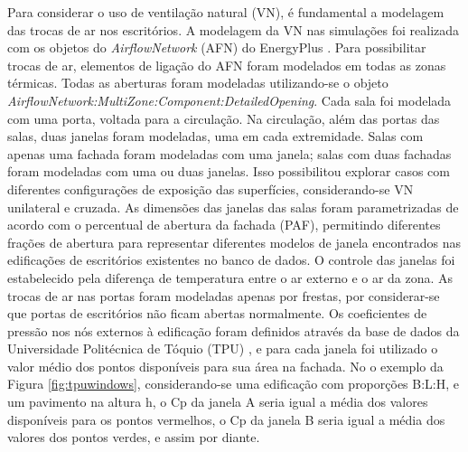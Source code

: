\documentclass[brazil,hardcopy,openany,a5paper]{ufscthesis}
\begin{document}
		Para considerar o uso de ventilação natural (VN), é fundamental a modelagem das trocas de ar nos escritórios. A modelagem da VN nas simulações foi realizada com os objetos do \textit{AirflowNetwork} (AFN) do EnergyPlus \cite{EnergyPlus2018}.
		Para possibilitar trocas de ar, elementos de ligação do AFN foram modelados em todas as zonas térmicas.
		Todas as aberturas foram modeladas utilizando-se o objeto \textit{AirflowNetwork:MultiZone:Component:DetailedOpening}.
		Cada sala foi modelada com uma porta, voltada para a circulação.
		Na circulação, além das portas das salas, duas janelas foram modeladas, uma em cada extremidade. 
		Salas com apenas uma fachada foram modeladas com uma janela; salas com duas fachadas foram modeladas com uma ou duas janelas. Isso possibilitou explorar casos com diferentes configurações de exposição das superfícies, considerando-se VN unilateral e cruzada.		
		As dimensões das janelas das salas foram parametrizadas de acordo com o percentual de abertura da fachada (PAF), permitindo diferentes frações de abertura para representar diferentes modelos de janela encontrados nas edificações de escritórios existentes no banco de dados.
		O controle das janelas foi estabelecido pela diferença de temperatura entre o ar externo e o ar da zona.
		As trocas de ar nas portas foram modeladas apenas por frestas, por considerar-se que portas de escritórios não ficam abertas normalmente.  %
		Os coeficientes de pressão nos nós externos à edificação foram definidos através da base de dados da Universidade Politécnica de Tóquio (TPU) \cite{TPU2018}, e para cada janela foi utilizado o valor médio dos pontos disponíveis para sua área na fachada. No o exemplo da Figura \ref{fig:tpuwindows}, considerando-se uma edificação com proporções B:L:H, e um pavimento na altura h, o Cp da janela A seria igual a média dos valores disponíveis para os pontos vermelhos, o Cp da janela B seria igual a média dos valores dos pontos verdes, e assim por diante.
		
\end{document}
